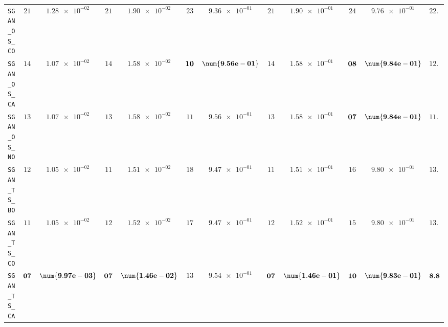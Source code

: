 \begin{table}[H]
\begin{tabularx}{\textwidth}{l||cC|cC|cC|cC|cC||c}
		\texttt{SGAN\_OS\_CO} & $ 21$ & $ \num{1.28e-02}$ & $ 21$ & $ \num{1.90e-02}$ & $ 23$ & $ \num{9.36e-01}$ & $ 21$ & $ \num{1.90e-01}$ & $ 24$ & $ \num{9.76e-01}$ & $ 22.0$  \\
		\texttt{SGAN\_OS\_CA} & $ 14$ & $ \num{1.07e-02}$ & $ 14$ & $ \num{1.58e-02}$ & $\bf 10$ & $\bf \num{9.56e-01}$ & $ 14$ & $ \num{1.58e-01}$ & $\bf 08$ & $\bf \num{9.84e-01}$ & $ 12.0$  \\
		\texttt{SGAN\_OS\_NO} & $ 13$ & $ \num{1.07e-02}$ & $ 13$ & $ \num{1.58e-02}$ & $ 11$ & $ \num{9.56e-01}$ & $ 13$ & $ \num{1.58e-01}$ & $\bf 07$ & $\bf \num{9.84e-01}$ & $ 11.4$  \\
		\texttt{SGAN\_TS\_BO} & $ 12$ & $ \num{1.05e-02}$ & $ 11$ & $ \num{1.51e-02}$ & $ 18$ & $ \num{9.47e-01}$ & $ 11$ & $ \num{1.51e-01}$ & $ 16$ & $ \num{9.80e-01}$ & $ 13.6$  \\
		\texttt{SGAN\_TS\_CO} & $ 11$ & $ \num{1.05e-02}$ & $ 12$ & $ \num{1.52e-02}$ & $ 17$ & $ \num{9.47e-01}$ & $ 12$ & $ \num{1.52e-01}$ & $ 15$ & $ \num{9.80e-01}$ & $ 13.4$  \\
		\texttt{SGAN\_TS\_CA} & $\bf 07$ & $\bf \num{9.97e-03}$ & $\bf 07$ & $\bf \num{1.46e-02}$ & $ 13$ & $ \num{9.54e-01}$ & $\bf 07$ & $\bf \num{1.46e-01}$ & $\bf 10$ & $\bf \num{9.83e-01}$ & $\bf 8.8$  \\

\end{tabularx}
\end{table}
